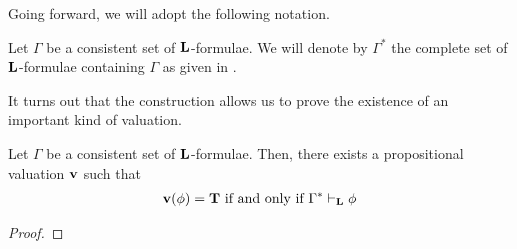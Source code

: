 Going forward, we will adopt the following notation.
\begin{boxconvention}
    Let $\Gamma$ be a consistent set of $\mathbf{L}$-formulae. We will denote by $\Gamma^*$ the complete set of $\mathbf{L}$-formulae containing $\Gamma$ as given in .
\end{boxconvention}

It turns out that the construction allows us to prove the existence of an important kind of valuation.

\begin{boxproposition}
    Let $\Gamma$ be a consistent set of $\mathbf{L}$-formulae. Then, there exists a propositional valuation $\mathbf{v}$ such that
    \begin{align*}
        \mathbf{v}\!\left( \phi \right) = \mathbf{T} \text{ if and only if } \Gamma^* \vdash_{\mathbf{L}} \phi
    \end{align*}
\end{boxproposition}
\begin{proof}
    \sorry
\end{proof}


